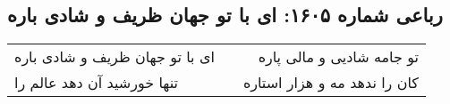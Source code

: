 \begin{center}
\section*{رباعی شماره ۱۶۰۵: ای با تو جهان ظریف و شادی باره}
\label{sec:1605}
\begin{longtable}{l p{0.5cm} r}
ای با تو جهان ظریف و شادی باره
&&
تو جامه شادیی و مالی پاره
\\
تنها خورشید آن دهد عالم را
&&
کان را ندهد مه و هزار استاره
\\
\end{longtable}
\end{center}
